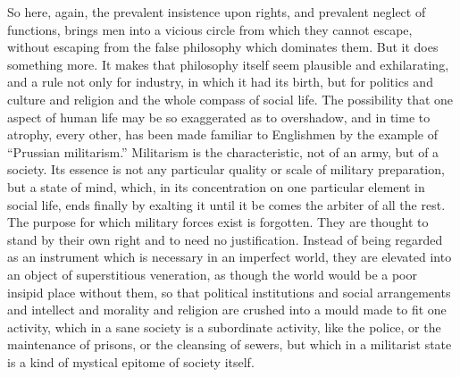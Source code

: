 \documentclass{book}
\begin{document}
So here, again, the prevalent insistence upon rights, and prevalent neglect of functions, brings men into a vicious circle from which they cannot escape, without escaping from the false philosophy which dominates them. But it does something more. It makes that philosophy itself seem plausible and exhilarating, and a rule not only for industry, in which it had its birth, but for politics and culture and religion and the whole compass of social life. The possibility that one aspect of human life may be so exaggerated as to overshadow, and in time to atrophy, every other, has been made familiar to Englishmen by the example of “Prussian militarism.” Militarism is the characteristic, not of an army, but of a society. Its essence is not any particular quality or scale of military preparation, but a state of mind, which, in its concentration on one particular element in social life, ends finally by exalting it until it be comes the arbiter of all the rest. The purpose for which military forces exist is forgotten. They are thought to stand by their own right and to need no justification. Instead of being regarded as an instrument which is necessary in an imperfect world, they are elevated into an object of superstitious veneration, as though the world would be a poor insipid place without them, so that political institutions and social arrangements and intellect and morality and religion are crushed into a mould made to fit one activity, which in a sane society is a subordinate activity, like the police, or the maintenance of prisons, or the cleansing of sewers, but which in a militarist state is a kind of mystical epitome of society itself.
\end{document}

